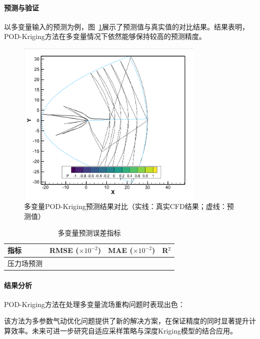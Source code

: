 \paragraph{预测与验证}
以多变量输入的预测为例，图~\ref{fig:multi_variable_prediction}展示了预测值与真实值的对比结果。结果表明，POD-Kriging方法在多变量情况下依然能够保持较高的预测精度。

\begin{figure}[htbp]
    \centering
    \includegraphics[width=0.8\textwidth]{多变量输出结果.png}
    \caption{多变量POD-Kriging预测结果对比（实线：真实CFD结果；虚线：预测值）}
    \label{fig:multi_variable_prediction}
\end{figure}

\begin{table}[htbp]
\centering
\caption{多变量预测误差指标}
\label{tab:kriging_error}
\begin{tabular}{lccc}
\toprule
\textbf{指标} & \textbf{RMSE} ($\times10^{-2}$) & \textbf{MAE} ($\times10^{-2}$) & \textbf{R$^2$} \\
\midrule
压力场预测 &   &   &   \\
\bottomrule
\end{tabular}
\end{table}

\paragraph{结果分析}
POD-Kriging方法在处理多变量流场重构问题时表现出色：


该方法为多参数气动优化问题提供了新的解决方案，在保证精度的同时显著提升计算效率。未来可进一步研究自适应采样策略与深度Kriging模型的结合应用。